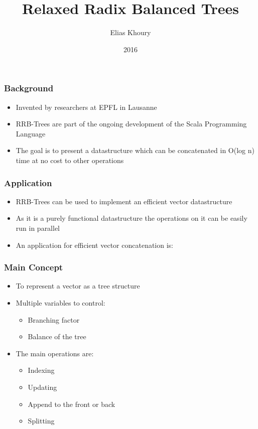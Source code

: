 \documentclass{beamer}
\title{Relaxed Radix Balanced Trees}
\author{Elias Khoury}
\date{2016}
\begin{document}
 
\frame{\titlepage}
 
\begin{frame}
\frametitle{Background}

\begin{itemize}

	\item Invented by researchers at EPFL in Lausanne
	\item RRB-Trees are part of the ongoing development of the Scala Programming Language
	\item The goal is to present a datastructure which can be concatenated in O(log n) time at no cost to other operations

\end{itemize}

\end{frame}
 
\begin{frame}

\frametitle{Application}

\begin{itemize}

	\item RRB-Trees can be used to implement an efficient vector datastructure
	\item As it is a purely functional datastructure the operations on it can be easily run in parallel  
	\item An application for efficient vector concatenation is:

\end{itemize}

\end{frame}
 
\begin{frame}
\frametitle{Main Concept}


\begin{itemize}

	\item To represent a vector as a tree structure
	\item Multiple variables to control:
		\begin{itemize}
			\item Branching factor
			\item Balance of the tree
		\end{itemize}
	\item The main operations are: 
	\noindent\parbox[t]{2.4in}{\raggedright%
		\begin{itemize}
			\item Indexing
			\item Updating
		\end{itemize}
	}%
	\noindent\parbox[t]{2.4in}{\raggedright%
		\begin{itemize}
			\item Append to the front or back
			\item Splitting
		\end{itemize}
	}%

\end{itemize}

\end{frame}
\end{document}
